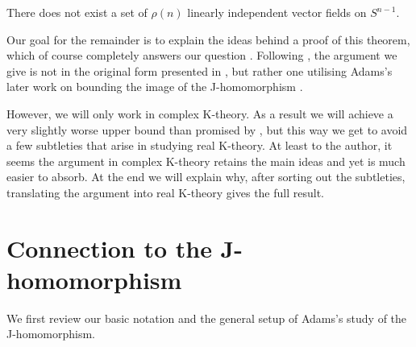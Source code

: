 \begin{theorem}
  \label{vfield-upper-bound}
  There does not exist a set of $\rho(n)$ linearly independent vector
  fields on $S^{n-1}$.
\end{theorem}

Our goal for the remainder is to explain the ideas behind a proof of
this theorem, which of course completely answers our question
. Following \cite{miller-vfields}, the argument we
give is not in the original form presented in \cite{adams-vfields},
but rather one utilising Adams's later work on bounding the image of
the J-homomorphism \cite{adams-J-II}.

However, we will only work in complex K-theory. As a result we will
achieve a very slightly worse upper bound than promised by
, but this way we get to avoid a few
subtleties that arise in studying real K-theory. At least to the
author, it seems the argument in complex K-theory retains the main
ideas and yet is much easier to absorb. At the end we will explain
why, after sorting out the subtleties, translating the argument into
real K-theory gives the full result.


\section{Connection to the J-homomorphism}

We first review our basic notation and the general setup of Adams's
study of the J-homomorphism.


